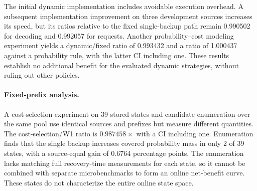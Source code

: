 The initial dynamic implementation includes avoidable execution overhead. A subsequent implementation improvement on three development sources increases its speed, but its ratios relative to the fixed single-backup path remain 0.990502 for decoding and 0.992057 for requests. Another probability--cost modeling experiment yields a dynamic/fixed ratio of 0.993432 and a ratio of 1.000437 against a probability rule, with the latter CI including one. These results establish no additional benefit for the evaluated dynamic strategies, without ruling out other policies.

\paragraph{Fixed-prefix analysis.}
A cost-selection experiment on 39 stored states and candidate enumeration over the same pool use identical sources and prefixes but measure different quantities. The cost-selection/W1 ratio is $0.987458\times$ with a CI including one. Enumeration finds that the single backup increases covered probability mass in only 2 of 39 states, with a source-equal gain of 0.6764 percentage points. The enumeration lacks matching full recovery-time measurements for each state, so it cannot be combined with separate microbenchmarks to form an online net-benefit curve. These states do not characterize the entire online state space.
